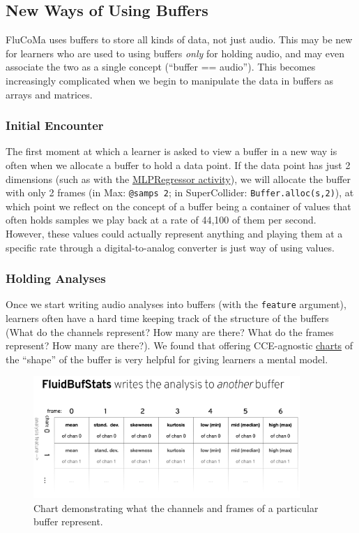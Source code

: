 \documentclass{article}
\begin{document}
\subsection{New Ways of Using Buffers}\label{new-ways-of-using-buffers}

FluCoMa uses buffers to store all kinds of data, not just audio. This
may be new for learners who are used to using buffers \emph{only} for
holding audio, and may even associate the two as a single concept
(``buffer == audio''). This becomes increasingly complicated when we
begin to manipulate the data in buffers as arrays and matrices.

\subsubsection{Initial Encounter}

The first moment at which a learner is asked to view a buffer in a new
way is often when we allocate a buffer to hold a data point. If the data
point has just 2 dimensions (such as with the
\hyperref[example-lesson-plan]{MLPRegressor activity}), we will allocate the
buffer with only 2 frames (in Max: \texttt{@samps\ 2}; in SuperCollider:
\texttt{Buffer.alloc(s,2)}), at which point we reflect on the concept of a buffer being a container of values that often holds samples we play back at a rate of 44,100 of them per second. However, these values could actually represent anything and playing them at a specific rate through a digital-to-analog converter is just way of using values.

\subsubsection{Holding Analyses}

Once we start writing audio analyses into buffers (with the
\texttt{feature} argument), learners often have a hard time keeping track
of the structure of the buffers (What do the channels represent? How
many are there? What do the frames represent? How many are there?). We
found that offering CCE-agnostic
\href{https://f003.backblazeb2.com/file/learnassets/examples/teaching-material/buffer-charts.pdf}{charts}
of the ``shape'' of the buffer is very helpful for giving learners a
mental model.

\begin{figure}[H]
\centering
\includegraphics[width=0.9\textwidth]{./figures/bufstats-chart.png}
\caption{Chart demonstrating what the channels and frames of a particular buffer represent.}
\label{fig:bufstats-chart}
\end{figure}
\end{document}
